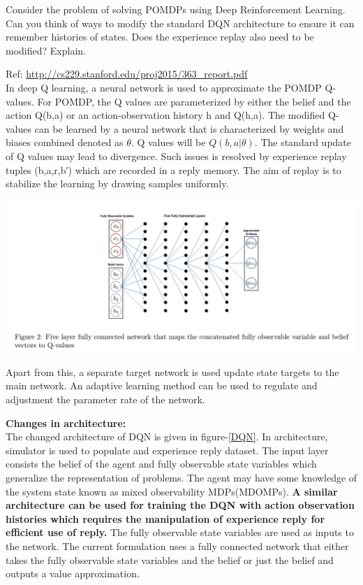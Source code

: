 \documentclass[solution,addpoints,12pt]{exam}
\begin{document}
\begin{questions}
\question[3] Consider the problem of solving POMDPs using Deep Reinforcement Learning. Can you think of ways to modify the standard DQN architecture to ensure it can remember histories of states. Does the experience replay also need to be modified? Explain.

\begin{solution}
Ref: \url{ http://cs229.stanford.edu/proj2015/363_report.pdf} \\
In deep Q learning, a neural network is used to approximate the POMDP Q-values. For POMDP, the Q values are parameterized by either the belief and the action Q(b,a) or an action-observation history h and Q(h,a). The modified Q-values can be learned by a neural network that is characterized by weights and biases combined denoted as $\theta$. Q values will be $Q(b,a|\theta)$. The standard update of Q values may lead to divergence. Such issues is resolved by experience replay tuples (b,a,r,b′) which are recorded in a reply memory. The aim of replay is to stabilize the learning by drawing samples uniformly.

\begin{center}
	\includegraphics[trim={0cm 0cm 0cm 0cm},clip,scale=0.2]{DQN.png}\label{DQN}
\end{center}

Apart from this, a separate target network is used update state targets to the main network.  An adaptive learning method can be used  to  regulate and adjustment the parameter rate  of  the  network. 

\textbf{Changes in architecture:} \\
The changed architecture of DQN is given in figure-\ref{DQN}. In architecture, simulator is used to populate and experience reply dataset. The input layer consists the belief of the agent and fully observable state variables which generalize the representation of problems. The agent may have some knowledge of the system state known as mixed observability MDPs(MDOMPs). 
\textbf{A similar architecture can be used for training the DQN with action observation histories which requires the manipulation of experience reply for efficient use of reply.}  The fully observable state variables are used as inputs to the network. The current formulation uses a fully connected network that either takes the fully observable state variables and the belief or just the belief  and outputs a value approximation.
\end{solution}



\end{questions}
\end{document}

